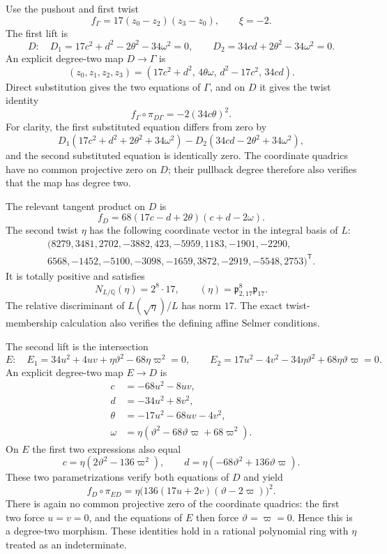 \documentclass[11pt,a4paper]{article}
\theoremstyle{definition}\newtheorem{definition}[theorem]{Definition}
\theoremstyle{remark}\newtheorem{remark}[theorem]{Remark}
\begin{document}
Use the pushout and first twist
\[
 f_\Gamma=17(z_0-z_2)(z_3-z_0),\qquad \xi=-2.
\]
The first lift is
\[
 D:\quad
 D_1=17c^2+d^2-2\theta^2-34\omega^2=0,\qquad
 D_2=34cd+2\theta^2-34\omega^2=0.
\]
An explicit degree-two map $D\longrightarrow\Gamma$ is
\begin{equation}\label{eq:D-Gamma-map}
 (z_0,z_1,z_2,z_3)
 =(17c^2+d^2,\,4\theta\omega,\,d^2-17c^2,\,34cd).
\end{equation}
Direct substitution gives the two equations of $\Gamma$, and on $D$
it gives the twist identity
\begin{equation}\label{eq:xi-twist-exact}
 f_\Gamma\circ\pi_{D\Gamma}=-2(34c\theta)^2.
\end{equation}
For clarity, the first substituted equation differs from zero by
\[
 D_1(17c^2+d^2+2\theta^2+34\omega^2)
 -D_2(34cd-2\theta^2+34\omega^2),
\]
and the second substituted equation is identically zero.
The coordinate quadrics have no common projective zero on $D$;
their pullback degree therefore also verifies that the map has degree two.

The relevant tangent product on $D$ is
\[
 f_D=68(17c-d+2\theta)(c+d-2\omega).
\]
The second twist $\eta$ has the following coordinate vector in the integral basis of $L$:
\[
\begin{gathered}
(8279,3481,2702,-3882,423,-5959,1183,-1901,-2290,\\
 6568,-1452,-5100,-3098,-1659,3872,-2919,-5548,2753)^{\mathsf T}.
\end{gathered}
\]
It is totally positive and satisfies
\[
 N_{L/\mathbb Q}(\eta)=2^8\cdot17,
 \qquad (\eta)=\mathfrak p_{2,17}^{8}\mathfrak p_{17}.
\]
The relative discriminant of $L(\sqrt\eta)/L$ has norm $17$.
The exact twist-membership calculation also verifies the defining
affine Selmer conditions.

The second lift is the intersection
\[
 E:\quad
 E_1=34u^2+4uv+\eta\vartheta^2-68\eta\varpi^2=0,
 \qquad
 E_2=17u^2-4v^2-34\eta\vartheta^2+68\eta\vartheta\varpi=0.
\]
An explicit degree-two map $E\longrightarrow D$ is
\begin{equation}\label{eq:E-D-map}
\begin{aligned}
 c&=-68u^2-8uv,\\
 d&=-34u^2+8v^2,\\
 \theta&=-17u^2-68uv-4v^2,\\
 \omega&=\eta(\vartheta^2-68\vartheta\varpi+68\varpi^2).
\end{aligned}
\end{equation}
On $E$ the first two expressions also equal
\[
 c=\eta(2\vartheta^2-136\varpi^2),\qquad
 d=\eta(-68\vartheta^2+136\vartheta\varpi).
\]
These two parametrizations verify both equations of $D$ and yield
\begin{equation}\label{eq:eta-twist-exact}
 f_D\circ\pi_{ED}
 =\eta\bigl(136(17u+2v)(\vartheta-2\varpi)\bigr)^2.
\end{equation}
There is again no common projective zero of the coordinate quadrics:
the first two force $u=v=0$, and the equations of $E$ then force
$\vartheta=\varpi=0$.  Hence this is a degree-two morphism.
These identities hold in a rational polynomial ring with $\eta$ treated as an indeterminate.
\end{document}
